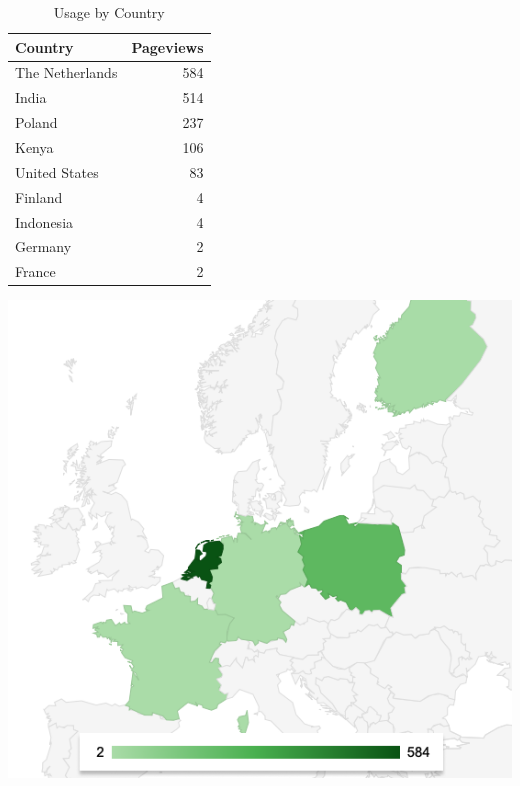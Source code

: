 \documentclass{article}
\begin{document}
\begin{table}[!htb]
	\begin{minipage}{.5\linewidth}
		\caption{Usage by Country}
		\centering
		\begin{tabular}{lr}
			\hline
			\textbf{Country} & \textbf{Pageviews} \\
			\hline
			The Netherlands  & 584                \\
			India            & 514                \\
			Poland           & 237                \\
			Kenya            & 106                \\
			United States    & 83                 \\
			Finland          & 4                  \\
			Indonesia        & 4                  \\
			Germany          & 2                  \\
			France           & 2                  \\
			\hline
		\end{tabular}
	\end{minipage}%
	\hspace{.1cm}
	\begin{minipage}{.5\linewidth}
		\centering
		\centering
		\includegraphics[width=1\linewidth]{location-europe.png}
		\label{fig:test2}
	\end{minipage} 
\end{table}
\end{document}
